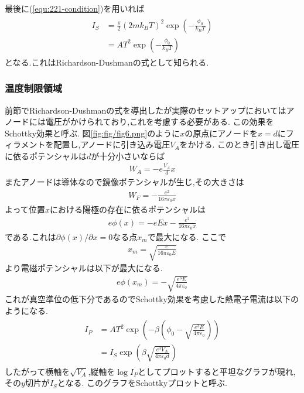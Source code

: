 最後に(\ref{equ:221-condition})を用いれば
\begin{align}
  \label{equ:221-RDmann}
  \begin{split}
    I_S&=\frac{\pi}{2}(2mk_BT)^2\exp\left(-\frac{\phi_0}{k_BT}\right)\\
    &=AT^2\exp\left(-\frac{\phi_0}{k_BT}\right)
  \end{split}
\end{align}
となる.これはRichardson-Dushmanの式として知られる.
\subsubsection{温度制限領域}
前節でRichardson-Dushmanの式を導出したが実際のセットアップにおいてはアノードには電圧がかけられており,これを考慮する必要がある.
この効果をSchottky効果と呼ぶ.
図\ref{fig:fig/fig6.png}のように$x$の原点にアノードを$x=d$にフィラメントを配置し,アノードに引き込み電圧$V_A$をかける.
このとき引き出し電圧に依るポテンシャルは$d$が十分小さいならば
\begin{align}
  W_A=-e\frac{V_A}{d}x
\end{align}
またアノードは導体なので鏡像ポテンシャルが生じ,その大きさは
\begin{align}
  W_F=-\frac{e^2}{16\pi\varepsilon_0x}
\end{align}
よって位置$x$における陽極の存在に依るポテンシャルは
\begin{align}
  e\phi(x)=-eEx-\frac{e^2}{16\pi\varepsilon_0x}
\end{align}
である.これは$\partial \phi(x)/\partial x=0$なる点$x_m$で最大になる.
ここで
\begin{align}
  x_m=\sqrt{\frac{e}{16\pi\varepsilon_0E}}
\end{align}
より電磁ポテンシャルは以下が最大になる.
\begin{align}
  e\phi(x_m)=-\sqrt{\frac{e^3E}{4\pi\varepsilon_0}}
\end{align}
これが真空準位の低下分であるのでSchottky効果を考慮した熱電子電流は以下のようになる.
\begin{align}
  \begin{split}
    I_P&=AT^2\exp\left(-\beta\left(\phi_0-\sqrt{\frac{e^3E}{4\pi\varepsilon_0}}\right)\right)\\
    &=I_S\exp\left(\beta\sqrt{\frac{e^3V_A}{4\pi\varepsilon_0d}}\right)    
  \end{split}
\end{align}
したがって横軸を$\sqrt{V_A}$,縦軸を$\log I_P$としてプロットすると平坦なグラフが現れ,その$y$切片が$I_S$となる.
このグラフをSchottkyプロットと呼ぶ.
